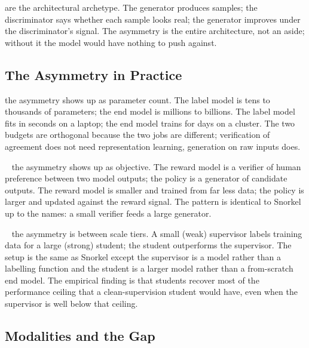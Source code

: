  are the architectural archetype. The generator produces samples; the discriminator says whether each sample looks real; the generator improves under the discriminator's signal. The asymmetry is the entire architecture, not an aside; without it the model would have nothing to push against.

\subsection{The Asymmetry in Practice}

 the asymmetry shows up as parameter count. The label model is tens to thousands of parameters; the end model is millions to billions. The label model fits in seconds on a laptop; the end model trains for days on a cluster. The two budgets are orthogonal because the two jobs are different; verification of agreement does not need representation learning, generation on raw inputs does.

~\cite{Christiano2017DeepRLPreferences,Ouyang2022InstructGPT} the asymmetry shows up as objective. The reward model is a verifier of human preference between two model outputs; the policy is a generator of candidate outputs. The reward model is smaller and trained from far less data; the policy is larger and updated against the reward signal. The pattern is identical to Snorkel up to the names: a small verifier feeds a large generator.

~\cite{Burns2024WeakToStrong} the asymmetry is between scale tiers. A small (weak) supervisor labels training data for a large (strong) student; the student outperforms the supervisor. The setup is the same as Snorkel except the supervisor is a model rather than a labelling function and the student is a larger model rather than a from-scratch end model. The empirical finding is that students recover most of the performance ceiling that a clean-supervision student would have, even when the supervisor is well below that ceiling.

\subsection{Modalities and the Gap}


